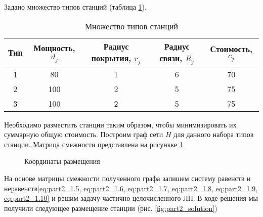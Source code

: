 Задано множество типов станций (таблица \ref{tab:part2_station_types}).

\begin{table}
    \centering
    \captionsetup{justification=centering} %
    \caption{Множество типов станций}\label{tab:part2_station_types}
    \begin{tabular}{|c|c|c|c|c|}
        \toprule
        Тип & Мощность, $\vartheta_j$ & Радиус покрытия, $r_j$  & Радиус связи, $R_j$ & Стоимость, $c_j$ \\
        \toprule
        1   & 80 & 1 & 6 & 70 \\
        2  & 100 & 2 & 5 & 75 \\
        3  & 100 & 2 & 5 & 75 \\
        \bottomrule
    \end{tabular}
\end{table}

Необходимо разместить станции таким образом, чтобы минимизировать их  суммарную общую стоимость.
Построим граф сети $H$ для данного набора типов станции. Матрица смежности представлена на рисункке \cref{fig:part2_adjacency_matrix}
 
\begin{figure}[ht]
    \caption{Координаты размещения}\label{fig:part2_adjacency_matrix}
\end{figure}



На основе матрицы смежности полученного графа запишем систему равенств и неравенств\cref{eq:part2_1.5, eq:part2_1.6, eq:part2_1.7, eq:part2_1.8, eq:part2_1.9, eq:part2_1.10} и решим задачу частично целочисленного ЛП.
В ходе решения мы получили следующее размещение станции (рис. \cref{fig:part2_solution})

